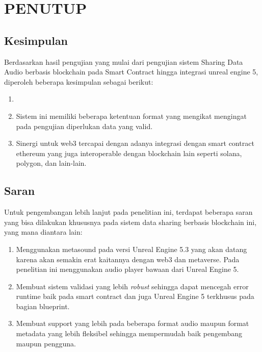 \chapter{PENUTUP}
\label{chap:penutup}


\section{Kesimpulan}
\label{sec:kesimpulan}

Berdasarkan hasil pengujian yang mulai dari pengujian sistem Sharing Data Audio berbasis blockchain pada Smart Contract hingga integrasi unreal engine 5, diperoleh beberapa kesimpulan sebagai berikut:

\begin{enumerate}[nolistsep]

  \item 

  \item Sistem ini memiliki beberapa ketentuan format yang mengikat mengingat pada pengujian diperlukan data yang valid.

  \item Sinergi untuk web3 tercapai dengan adanya integrasi dengan smart contract ethereum yang juga interoperable dengan blockchain lain seperti solana, polygon, dan lain-lain.

\end{enumerate}

\section{Saran}
\label{chap:saran}

Untuk pengembangan lebih lanjut pada penelitian ini, terdapat beberapa saran yang bisa dilakukan khususnya pada sistem data sharing berbasis blockchain ini, yang mana diantara lain:

\begin{enumerate}[nolistsep]

  \item Menggunakan metasound pada versi Unreal Engine 5.3 yang akan datang karena akan semakin erat kaitannya dengan web3 dan metaverse. Pada penelitian ini menggunakan audio player bawaan dari Unreal Engine 5.

  \item Membuat sistem validasi yang lebih \emph{robust} sehingga dapat mencegah error runtime baik pada smart contract dan juga Unreal Engine 5 terkhusus pada bagian blueprint.

  \item Membuat support yang lebih pada beberapa format audio maupun format metadata yang lebih fleksibel sehingga mempermudah baik pengembang maupun pengguna.

\end{enumerate}
